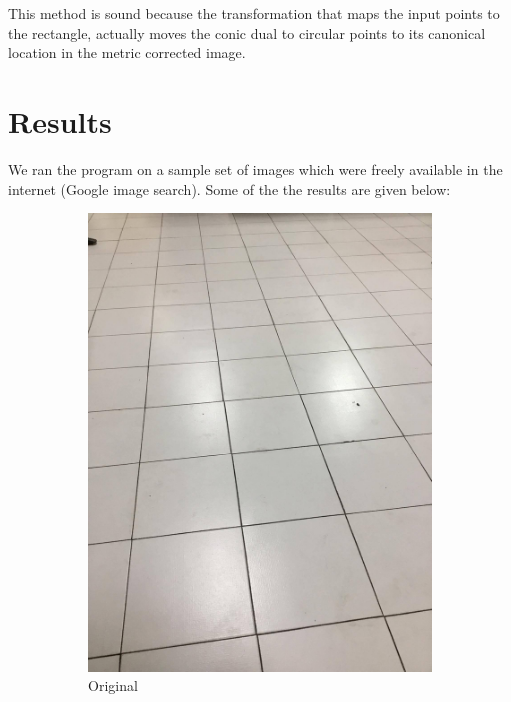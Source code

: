 \documentclass[paper=a4, fontsize=11pt]{scrartcl} %
\begin{document}
This method is sound because the transformation that maps the input points to the rectangle, actually
moves the conic dual to circular points to its canonical location in the metric corrected image.

\section{Results}
We ran the program on a sample set of images which were freely available in the internet (Google image search).
Some of the the results are given below:
  \begin{figure}
    \centering
    \begin{subfigure}[ht]{0.3\textwidth}
        \centering
        \includegraphics[width=\textwidth]{figures/persp_tile.jpg}
        \caption{Original\label{fig:persp_tile}}    
    \end{subfigure}
    \hfill
    \begin{subfigure}[ht]{0.3\textwidth}  

\end{subfigure}
\end{figure}
\end{document}
